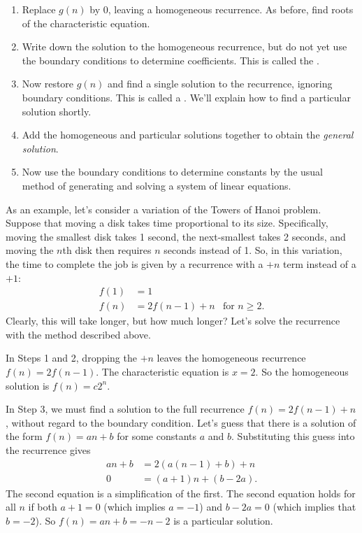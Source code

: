 \begin{enumerate}

\item Replace $g(n)$ by 0, leaving a homogeneous recurrence.  As
  before, find roots of the characteristic equation.

\item Write down the solution to the homogeneous recurrence, but do
  not yet use the boundary conditions to determine coefficients.  This
  is called the .

\item Now restore $g(n)$ and find a single solution to the recurrence,
  ignoring boundary conditions.  This is called a .  We'll explain how to find a particular solution
  shortly.

\item Add the homogeneous and particular solutions together to obtain
  the \emph{general solution}.

\item Now use the boundary conditions to determine constants by the
  usual method of generating and solving a system of linear equations.

\end{enumerate}

As an example, let's consider a variation of the Towers of Hanoi
problem.  Suppose that moving a disk takes time proportional to its
size.  Specifically, moving the smallest disk takes 1 second, the
next-smallest takes 2 seconds, and moving the $n$th disk then
requires $n$ seconds instead of 1.  So, in this variation, the time to
complete the job is given by a recurrence with a $+n$ term instead of
a $+1$:
\begin{align*}
f(1) & = 1 \\
f(n) & = 2 f(n - 1) + n & \text{for $n \geq 2$}.
\end{align*}
Clearly, this will take longer, but how much longer?  Let's solve the
recurrence with the method described above.

In Steps 1 and 2, dropping the $+n$ leaves the homogeneous recurrence
$f(n) = 2 f(n -1)$.  The characteristic equation is $x = 2$.  So the
homogeneous solution is $f(n) = c2^n$.

In Step 3, we must find a solution to the full recurrence $f(n) = 2
f(n - 1) + n$, without regard to the boundary condition.  Let's guess
that there is a solution of the form $f(n) = a n + b$ for some
constants $a$ and $b$.  Substituting this guess into the recurrence
gives
\begin{align*}
a n + b & = 2 (a (n - 1) + b) + n \\
0 & = (a + 1) n + (b - 2 a).
\end{align*}
The second equation is a simplification of the first.  The second
equation holds for all $n$ if both $a + 1 = 0$ (which implies $a =
-1$) and $b - 2a = 0$ (which implies that $b = -2$).  So $f(n) = an +
b = -n - 2$ is a particular solution.

